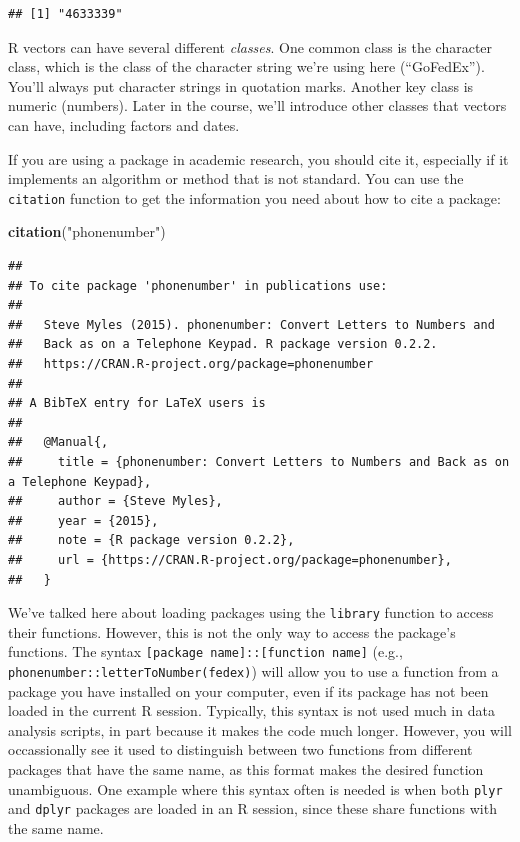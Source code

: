 \documentclass[]{book}
\makeatletter
\newenvironment{Shaded}{\begin{snugshade}}{\end{snugshade}}
\newcommand{\KeywordTok}[1]{\textcolor[rgb]{0.13,0.29,0.53}{\textbf{#1}}}
\newcommand{\StringTok}[1]{\textcolor[rgb]{0.31,0.60,0.02}{#1}}
\newcommand{\NormalTok}[1]{#1}
\newenvironment{kframe}{%
\medskip{}
\setlength{\fboxsep}{.8em}
 \def\at@end@of@kframe{}%
 \ifinner\ifhmode%
  \def\at@end@of@kframe{\end{minipage}}%
  \begin{minipage}{\columnwidth}%
 \fi\fi%
 \def\FrameCommand##1{\hskip\@totalleftmargin \hskip-\fboxsep
 \colorbox{shadecolor}{##1}\hskip-\fboxsep
     \hskip-\linewidth \hskip-\@totalleftmargin \hskip\columnwidth}%
 \MakeFramed {\advance\hsize-\width
   \@totalleftmargin\z@ \linewidth\hsize
   \@setminipage}}%
 {\par\unskip\endMakeFramed%
 \at@end@of@kframe}
\renewenvironment{Shaded}{\begin{kframe}}{\end{kframe}}
\newenvironment{rmdblock}[1]
  {
  \begin{itemize}
  \renewcommand{\labelitemi}{
    \raisebox{-.7\height}[0pt][0pt]{
      {\setkeys{Gin}{width=3em,keepaspectratio}\texttt{[image: images/\#1]}}
    }
  }
  \setlength{\fboxsep}{1em}
  \begin{kframe}
  \item
  }
  {
  \end{kframe}
  \end{itemize}
  }
\newenvironment{rmdnote}
  {\begin{rmdblock}{note}}
  {\end{rmdblock}}
\theoremstyle{definition}
\theoremstyle{definition}
\theoremstyle{definition}
\theoremstyle{remark}
\makeatother
\begin{document}
\begin{verbatim}
## [1] "4633339"
\end{verbatim}

\begin{rmdnote}
R vectors can have several different \emph{classes}. One common class is
the character class, which is the class of the character string we're
using here (``GoFedEx''). You'll always put character strings in
quotation marks. Another key class is numeric (numbers). Later in the
course, we'll introduce other classes that vectors can have, including
factors and dates.
\end{rmdnote}

If you are using a package in academic research, you should cite it,
especially if it implements an algorithm or method that is not standard.
You can use the \texttt{citation} function to get the information you
need about how to cite a package:

\begin{Shaded}
\begin{Highlighting}[]
\KeywordTok{citation}\NormalTok{(}\StringTok{"phonenumber"}\NormalTok{)}
\end{Highlighting}
\end{Shaded}

\begin{verbatim}
## 
## To cite package 'phonenumber' in publications use:
## 
##   Steve Myles (2015). phonenumber: Convert Letters to Numbers and
##   Back as on a Telephone Keypad. R package version 0.2.2.
##   https://CRAN.R-project.org/package=phonenumber
## 
## A BibTeX entry for LaTeX users is
## 
##   @Manual{,
##     title = {phonenumber: Convert Letters to Numbers and Back as on a Telephone Keypad},
##     author = {Steve Myles},
##     year = {2015},
##     note = {R package version 0.2.2},
##     url = {https://CRAN.R-project.org/package=phonenumber},
##   }
\end{verbatim}

\begin{rmdnote}
We've talked here about loading packages using the \texttt{library}
function to access their functions. However, this is not the only way to
access the package's functions. The syntax
\texttt{{[}package\ name{]}::{[}function\ name{]}} (e.g.,
\texttt{phonenumber::letterToNumber(fedex)}) will allow you to use a
function from a package you have installed on your computer, even if its
package has not been loaded in the current R session. Typically, this
syntax is not used much in data analysis scripts, in part because it
makes the code much longer. However, you will occassionally see it used
to distinguish between two functions from different packages that have
the same name, as this format makes the desired function unambiguous.
One example where this syntax often is needed is when both \texttt{plyr}
and \texttt{dplyr} packages are loaded in an R session, since these
share functions with the same name.
\end{rmdnote}
\end{document}
